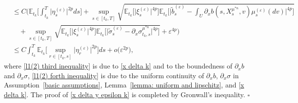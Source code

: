 \documentclass[12pt]{article}
\theoremstyle{named}
\numberwithin{equation}{section}
\newenvironment{Proof}{\removelastskip\par\medskip \noindent{\em Proof.} \rm}{\penalty-20\null\hfill$\square$\par\medbreak}
\begin{document}
\begin{Proof}
\begin{align}
    & \leq    C
    \biggl(
    \mathbb{E}_{t_k}\biggl[
      \int_{t_k}^{T} \big|\eta^{(\varepsilon )}_s\big|^{2p} ds
      \biggr]
    + \sup\limits_{s \in [t_k,T]}
    \sqrt{\mathbb{E}_{t_k}\big[
        \big| \xi^{(\varepsilon )}_s \big|^{4p} \big]\mathbb{E}_{t_k}\biggl[
        \biggl|
                 \tilde{b}^{(\varepsilon )}_s - \int_U \partial_xb(s, X^{\mu^{*n}}_s, v) \mu^{(\varepsilon )}_s(dv)
            \biggr|^{4p} \biggr] }
    \nonumber
    \\
    &
    \quad
    + \sup\limits_{s \in [t_k,T]}
    \sqrt{ \mathbb{E}_{t_k}\bigl[ \big|
            \xi^{(\varepsilon )}_s
\big|^{4p} \bigr]\mathbb{E}_{t_k}\bigl[ \bigl|
                \tilde{\sigma}^{(\varepsilon )}_s - \partial_x \sigma^{\mu^{*n} }_{t_k ,s}
            \bigr|^{4p} \bigr]}
    + \varepsilon^{4p} \biggr)
    \label{l1(2) third inequality}\\
    & \leq C \int_{t_k}^T \mathbb{E}_{t_k}\biggl[ \sup\limits_{r \in [t_k,s]}
    \big|\eta^{(\varepsilon )}_r\big|^{2p} \biggr] ds  + o\bigl(\varepsilon^{2p}\bigr) ,\label{l1(2) forth inequality}
\end{align}
where  \eqref{l1(2) third inequality} is due to
 \eqref{x delta k} and to the boundedness of
 $\partial_xb$ and $\partial_x\sigma$,
 \eqref{l1(2) forth inequality} is due to the uniform continuity of $\partial_xb$,
  $\partial_x\sigma$ in Assumption~\ref{basic assumptions}, Lemma~\ref{lemma: uniform and lipschitz}, and \eqref{x delta k}.
The proof of \eqref{x delta y epsilon k} is completed by Gronwall's inequality.
\end{Proof}
\end{document}
